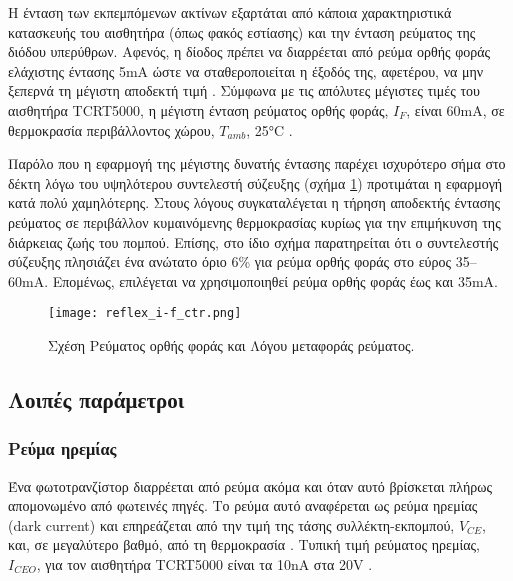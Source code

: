 Η ένταση των εκπεμπόμενων ακτίνων εξαρτάται από κάποια χαρακτηριστικά κατασκευής
του αισθητήρα (όπως φακός εστίασης) και την ένταση ρεύματος της διόδου
υπερύθρων.
Αφενός, η δίοδος πρέπει να διαρρέεται από ρεύμα ορθής φοράς ελάχιστης έντασης
5mA ώστε να σταθεροποιείται η έξοδός της, αφετέρου, να μην ξεπερνά τη μέγιστη
αποδεκτή τιμή \parencite{vishay02}. Σύμφωνα με τις απόλυτες μέγιστες τιμές του
αισθητήρα TCRT5000, η μέγιστη ένταση ρεύματος ορθής φοράς, $I_F$, είναι 60mA, σε
θερμοκρασία περιβάλλοντος χώρου, $T_{amb}$, 25°C \parencite{vishay09}.

Παρόλο που η εφαρμογή της μέγιστης δυνατής έντασης παρέχει ισχυρότερο σήμα στο
δέκτη λόγω του υψηλότερου συντελεστή σύζευξης (σχήμα \ref{fig:reflex:i-f_ctr})
προτιμάται η εφαρμογή κατά πολύ χαμηλότερης. Στους λόγους συγκαταλέγεται η
τήρηση αποδεκτής έντασης ρεύματος σε περιβάλλον κυμαινόμενης θερμοκρασίας κυρίως
για την επιμήκυνση της διάρκειας ζωής του πομπού. Επίσης, στο ίδιο σχήμα
παρατηρείται ότι ο συντελεστής σύζευξης πλησιάζει ένα ανώτατο όριο 6\% για ρεύμα
ορθής φοράς στο εύρος 35--60mA. Επομένως, επιλέγεται να χρησιμοποιηθεί ρεύμα
ορθής φοράς έως και 35mA.

\begin{figure}
    \caption{Σχέση Ρεύματος ορθής φοράς και Λόγου μεταφοράς ρεύματος.
    \label{fig:reflex:i-f_ctr}}
    \begin{center}%
    \texttt{[image: reflex\_i-f\_ctr.png]}
    \end{center}

\end{figure}


\subsection{Λοιπές παράμετροι}
\label{subsec:reflex:other-parameters}


\subsubsection{Ρεύμα ηρεμίας}

Ένα φωτοτρανζίστορ διαρρέεται από ρεύμα ακόμα και όταν αυτό βρίσκεται πλήρως
απομονωμένο από φωτεινές πηγές. Το ρεύμα αυτό αναφέρεται ως ρεύμα ηρεμίας
 (dark current) και επηρεάζεται από την τιμή της
τάσης συλλέκτη-εκπομπού, $V_{CE}$, και, σε μεγαλύτερο βαθμό, από τη θερμοκρασία
\parencite{vishay06}. Τυπική τιμή ρεύματος ηρεμίας, $I_{CEO}$, για τον αισθητήρα
TCRT5000 είναι τα 10nA στα 20V \parencite{vishay09}.

